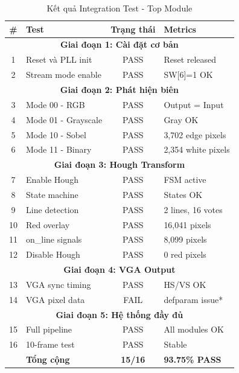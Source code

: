 \documentclass[12pt,a4paper]{article}
\begin{document}
\begin{table}[H]
\centering
\caption{Kết quả Integration Test - Top Module}
\small
\begin{tabular}{|c|l|c|l|}
\hline
\textbf{\#} & \textbf{Test} & \textbf{Trạng thái} & \textbf{Metrics} \\
\hline
\multicolumn{4}{|c|}{\textbf{Giai đoạn 1: Cài đặt cơ bản}} \\
\hline
1 & Reset và PLL init & \cellcolor{passgreen!30}PASS & Reset released \\
\hline
2 & Stream mode enable & \cellcolor{passgreen!30}PASS & SW[6]=1 OK \\
\hline
\multicolumn{4}{|c|}{\textbf{Giai đoạn 2: Phát hiện biên}} \\
\hline
3 & Mode 00 - RGB & \cellcolor{passgreen!30}PASS & Output = Input \\
\hline
4 & Mode 01 - Grayscale & \cellcolor{passgreen!30}PASS & Gray OK \\
\hline
5 & Mode 10 - Sobel & \cellcolor{passgreen!30}PASS & 3,702 edge pixels \\
\hline
6 & Mode 11 - Binary & \cellcolor{passgreen!30}PASS & 2,354 white pixels \\
\hline
\multicolumn{4}{|c|}{\textbf{Giai đoạn 3: Hough Transform}} \\
\hline
7 & Enable Hough & \cellcolor{passgreen!30}PASS & FSM active \\
\hline
8 & State machine & \cellcolor{passgreen!30}PASS & States OK \\
\hline
9 & Line detection & \cellcolor{passgreen!30}PASS & 2 lines, 16 votes \\
\hline
10 & Red overlay & \cellcolor{passgreen!30}PASS & 16,041 pixels \\
\hline
11 & on\_line signals & \cellcolor{passgreen!30}PASS & 8,099 pixels \\
\hline
12 & Disable Hough & \cellcolor{passgreen!30}PASS & 0 red pixels \\
\hline
\multicolumn{4}{|c|}{\textbf{Giai đoạn 4: VGA Output}} \\
\hline
13 & VGA sync timing & \cellcolor{passgreen!30}PASS & HS/VS OK \\
\hline
14 & VGA pixel data & \cellcolor{failred!30}FAIL & defparam issue* \\
\hline
\multicolumn{4}{|c|}{\textbf{Giai đoạn 5: Hệ thống đầy đủ}} \\
\hline
15 & Full pipeline & \cellcolor{passgreen!30}PASS & All modules OK \\
\hline
16 & 10-frame test & \cellcolor{passgreen!30}PASS & Stable \\
\hline
\hline
 & \textbf{Tổng cộng} & \textbf{15/16} & \textbf{93.75\% PASS} \\
\hline
\end{tabular}
\end{table}
\end{document}

